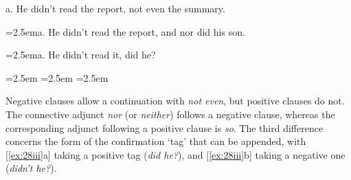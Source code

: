 \begin{examples}
\item \label{ex:28}
\noindent\begin{minipage}[t]{0.5\linewidth}{
\par\vspace{\smallskipamount}
    \begin{examples}
        \item \label{ex:28i} 
            \textnormal{a.} He didn't read the report, not even the \phantom{|}\hspace{1em}summary.
        \item \label{ex:28ii}
            \hangindent=2.5em\textnormal{a.} He didn't read the report, and nor did \phantom{|}\hspace{1em}his son.
        \item \label{ex:28iii}
            \hangindent=2.5em\textnormal{a.} He didn't read it, did he?
    \end{examples}}
\end{minipage}\vspace{-\medskipamount}%
\begin{minipage}[t]{0.45\linewidth}
{
{\par\vspace{\smallskipamount}}
    \hangindent=2.5em 
    \hangindent=2.5em 
    \hangindent=2.5em }
\end{minipage}
\end{examples}
\medskip
\noindent Negative clauses allow a continuation with \textit{not even}, but positive clauses do not. The connective adjunct \textit{nor} (or \textit{neither}) follows a negative clause, whereas the corresponding adjunct following a positive clause is \textit{so}. The third difference concerns the form of the confirmation `tag' that can be appended, with [\ref{ex:28iii}a] taking a positive tag (\textit{did he?}), and [\ref{ex:28iii}b] taking a negative one (\textit{didn't he?}).

\newpage

